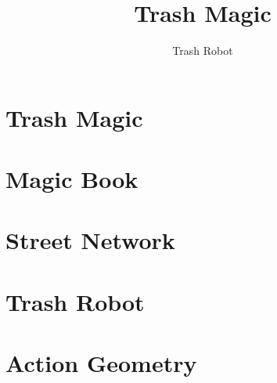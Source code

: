 \documentclass{report}
\title{Trash Magic}
\author{Trash Robot}
\begin{document}
\clearpage

\clearpage

\newpage
\thispagestyle{empty}
\mbox{}

\maketitle



%

\chapter{Trash Magic}

\chapter{Magic Book}

\chapter{Street Network}

\chapter{Trash Robot}

\chapter{Action Geometry}




\end{document}
